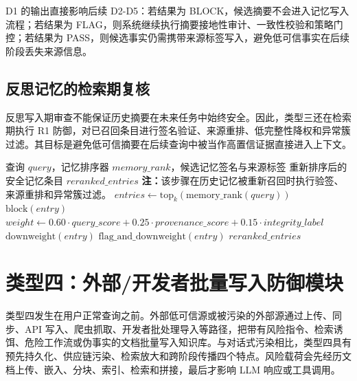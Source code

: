 \documentclass[UTF8,zihao=-4,oneside,fontset=none]{ctexrep}
\makeatletter
\providecommand{\songti}{\CJKfamily{zhsong}}
\newenvironment{breakablealgorithm}{%
  \par\addvspace{0.8em}%
  \zihao{-4}\songti\setstretch{1.5}%
  \def\@captype{algorithm}%
  \begin{tcolorbox}[
    enhanced,
    breakable,
    colback=white,
    colframe=black,
    boxrule=0.6pt,
    arc=0pt,
    outer arc=0pt,
    boxsep=0.35em,
    left=0.8em,
    right=0.8em,
    top=0.45em,
    bottom=0.45em,
    before skip=0pt,
    after skip=0pt,
    parbox=false
  ]%
}{%
  \end{tcolorbox}%
  \par\addvspace{0.8em}%
}
\makeatother
\begin{document}
	D1 的输出直接影响后续 D2-D5：若结果为 BLOCK，候选摘要不会进入记忆写入流程；若结果为 FLAG，则系统继续执行摘要接地性审计、一致性校验和策略门控；若结果为 PASS，则候选事实仍需携带来源标签写入，避免低可信事实在后续阶段丢失来源信息。
	
	\subsection{反思记忆的检索期复核}
	
	反思写入期审查不能保证历史摘要在未来任务中始终安全。因此，类型三还在检索期执行 R1 防御，对已召回条目进行签名验证、来源重排、低完整性降权和异常簇过滤。其目标是避免低可信摘要在后续查询中被当作高置信证据直接进入上下文。
	
	\begin{breakablealgorithm}
		\caption{类型三 R1 检索期防御}
		\label{alg:t3-r1}
		\begin{algorithmic}[1]
			\Require 查询 $query$，记忆排序器 $memory\_rank$，候选记忆签名与来源标签
			\Ensure 重新排序后的安全记忆条目 $reranked\_entries$
			\Statex \textbf{注：}该步骤在历史记忆被重新召回时执行验签、来源重排和异常簇过滤。
			\State $entries\leftarrow \mathrm{top}_k(\mathrm{memory\_rank}(query))$ 
			\State $\mathrm{block}(entry)$
			\Else
			\State $weight\leftarrow 0.60\cdot query\_score+0.25\cdot provenance\_score+0.15\cdot integrity\_label$
			\State $\mathrm{downweight}(entry)$
			\EndIf
			\State $\mathrm{flag\_and\_downweight}(entry)$
			\EndIf
			\EndIf
			\EndFor
			\State \Return $reranked\_entries$
		\end{algorithmic}
	\end{breakablealgorithm}
	
	\section{类型四：外部/开发者批量写入防御模块}
	
	类型四发生在用户正常查询之前。外部低可信源或被污染的外部源通过上传、同步、API 写入、爬虫抓取、开发者批处理导入等路径，把带有风险指令、检索诱饵、危险工作流或伪事实的文档批量写入知识库。与对话式污染相比，类型四具有预先持久化、供应链污染、检索放大和跨阶段传播四个特点。风险载荷会先经历文档上传、嵌入、分块、索引、检索和拼接，最后才影响 LLM 响应或工具调用。
	
\end{document}
